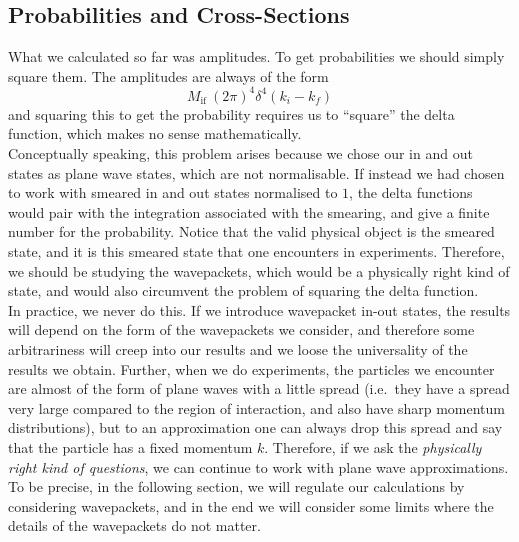 \documentclass[11pt, notitlepage]{report}
\numberwithin{equation}{section}
\begin{document}
    \subsection{Probabilities and Cross-Sections}

    What we calculated so far was amplitudes. To get probabilities we should simply square them. The amplitudes are always of the form 
    \begin{equation*}
        M_{\text{if}}~ (2\pi)^4\delta^4(k_i - k_f)
    \end{equation*}
    and squaring this to get the probability requires us to ``square'' the delta function, which makes no sense mathematically.\\
    
    Conceptually speaking, this problem arises because we chose our in and out states as plane wave states, which are not normalisable. If instead we had chosen to work with smeared in and out states normalised to \(1\), the delta functions would pair with the integration associated with the smearing, and give a finite number for the probability. Notice that the valid physical object is the smeared state, and it is this smeared state that one encounters in experiments. Therefore, we should be studying the wavepackets, which would be a physically right kind of state, and would also circumvent the problem of squaring the delta function.\\

    In practice, we never do this. If we introduce wavepacket in-out states, the results will depend on the form of the wavepackets we consider, and therefore some arbitrariness will creep into our results and we loose the universality of the results we obtain. Further, when we do experiments, the particles we encounter are almost of the form of plane waves with a little spread (i.e.\ they have a spread very large compared to the region of interaction, and also have sharp momentum distributions), but to an approximation one can always drop this spread and say that the particle has a fixed momentum \(k\). Therefore, if we ask the \textit{physically right kind of questions}, we can continue to work with plane wave approximations. \\
    
    To be precise, in the following section, we will regulate our calculations by considering wavepackets, and in the end we will consider some limits where the details of the wavepackets do not matter. \\
\end{document}
